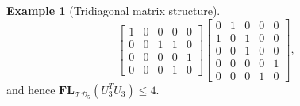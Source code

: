 \documentclass[reqno]{amsart}
\theoremstyle{definition}
\newtheorem{example}[theorem]{Example}
\numberwithin{equation}{section}
\begin{document}
\begin{example}[Tridiagonal matrix structure]
\begin{equation*}
\begin{bmatrix}
            1 & 0 & 0 & 0 & 0\\
            0 & 0 & 1 & 1 & 0\\
            0 & 0 & 0 & 0 & 1\\
            0 & 0 & 0 & 1 & 0
        \end{bmatrix}\begin{bmatrix}
            0 & 1 & 0 & 0 & 0\\
            1 & 0 & 1 & 0 & 0\\
            0 & 0 & 1 & 0 & 0\\
            0 & 0 & 0 & 0 & 1\\
            0 & 0 & 0 & 1 & 0
        \end{bmatrix},
    \end{equation*}
    and hence $\mathbf{FL}_{\mathcal{TD}_5}(U_3^TU_3) \leq 4$.


\end{example}
\end{document}
